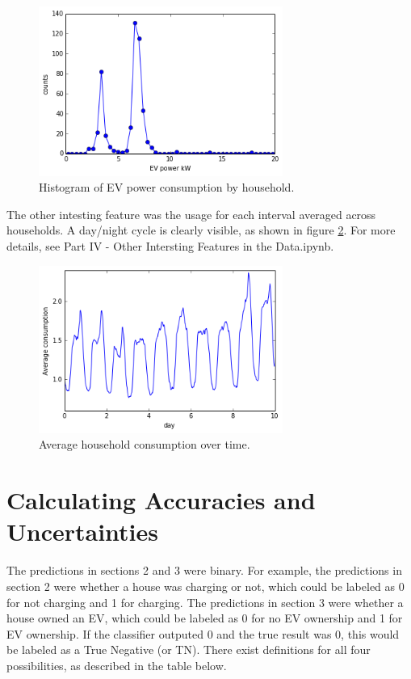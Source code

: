 \documentclass[12pt]{extarticle}
\begin{document}
\begin{figure}
\centering
\includegraphics[width=8cm]{power}
\caption{Histogram of EV power consumption by household.}
\label{fig:power}
\end{figure}

The other intesting feature was the usage for each interval averaged across households.
A day/night cycle is clearly visible, as shown in figure \ref{fig:daynight}.
For more details, see Part IV - Other Intersting Features in the Data.ipynb.

\begin{figure}
\centering
\includegraphics[width=8cm]{daynight}
\caption{Average household consumption over time.}
\label{fig:daynight}
\end{figure}


\section{Calculating Accuracies and Uncertainties}
The predictions in sections 2 and 3 were binary.
For example, the predictions in section 2 were whether a house was charging or not, which could be labeled as 0 for not charging and 1 for charging.
The predictions in section 3 were whether a house owned an EV, which could be labeled as 0 for no EV ownership and 1 for EV ownership.
If the classifier outputed 0 and the true result was 0, this would be labeled as a True Negative (or TN).
There exist definitions for all four possibilities, as described in the table below.
\\
\end{document}
